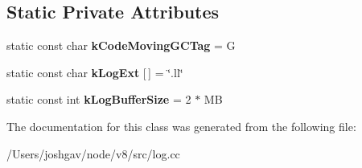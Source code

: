 \subsection*{Static Private Attributes}
\begin{DoxyCompactItemize}
\item 
static const char {\bfseries k\+Code\+Moving\+G\+C\+Tag} = \textquotesingle{}G\textquotesingle{}\hypertarget{classv8_1_1internal_1_1_low_level_logger_a1f8a85fcef899a520e2c987c80475397}{}\label{classv8_1_1internal_1_1_low_level_logger_a1f8a85fcef899a520e2c987c80475397}

\item 
static const char {\bfseries k\+Log\+Ext} \mbox{[}$\,$\mbox{]} = \char`\"{}.ll\char`\"{}\hypertarget{classv8_1_1internal_1_1_low_level_logger_a08a07113678e794cb845fe3770081bb3}{}\label{classv8_1_1internal_1_1_low_level_logger_a08a07113678e794cb845fe3770081bb3}

\item 
static const int {\bfseries k\+Log\+Buffer\+Size} = 2 $\ast$ MB\hypertarget{classv8_1_1internal_1_1_low_level_logger_a2542e11e15c85b96bf1d90505169c6bd}{}\label{classv8_1_1internal_1_1_low_level_logger_a2542e11e15c85b96bf1d90505169c6bd}

\end{DoxyCompactItemize}


The documentation for this class was generated from the following file\+:\begin{DoxyCompactItemize}
\item 
/\+Users/joshgav/node/v8/src/log.\+cc\end{DoxyCompactItemize}
